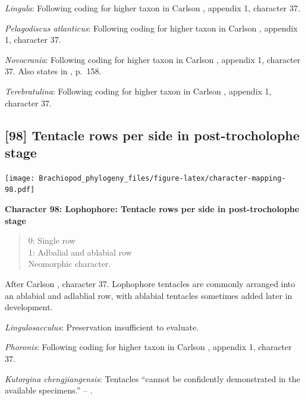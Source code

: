 \documentclass[]{book}
\theoremstyle{definition}
\theoremstyle{definition}
\theoremstyle{definition}
\theoremstyle{remark}
\begin{document}
\emph{Lingula}: Following coding for higher taxon in Carlson
\citeyearpar{Carlson1995Phylogeneticrelationships}, appendix 1,
character 37.

\emph{Pelagodiscus atlanticus}: Following coding for higher taxon in
Carlson \citeyearpar{Carlson1995Phylogeneticrelationships}, appendix 1,
character 37.

\emph{Novocrania}: Following coding for higher taxon in Carlson
\citeyearpar{Carlson1995Phylogeneticrelationships}, appendix 1,
character 37. Also states in
\citet{Williams2000BrachiopodaLinguliformea}, p.~158.

\emph{Terebratulina}: Following coding for higher taxon in Carlson
\citeyearpar{Carlson1995Phylogeneticrelationships}, appendix 1,
character 37.

\hypertarget{tentacle-rows-per-side-in-post-trocholophe-stage}{%
\subsection*{{[}98{]} Tentacle rows per side in post-trocholophe
stage}\label{tentacle-rows-per-side-in-post-trocholophe-stage}}

\texttt{[image: Brachiopod\_phylogeny\_files/figure-latex/character-mapping-98.pdf]}

\textbf{Character 98: Lophophore: Tentacle rows per side in
post-trocholophe stage}

\begin{quote}
0: Single row\\
1: Adbalial and ablabial row\\
Neomorphic character.
\end{quote}

After Carlson \citeyearpar{Carlson1995Phylogeneticrelationships},
character 37. Lophophore tentacles are commonly arranged into an
ablabial and adlablial row, with ablabial tentacles sometimes added
later in development.

\emph{Lingulosacculus}: Preservation insufficient to evaluate.

\emph{Phoronis}: Following coding for higher taxon in Carlson
\citeyearpar{Carlson1995Phylogeneticrelationships}, appendix 1,
character 37.

\emph{Kutorgina chengjiangensis}: Tentacles ``cannot be confidently
demonstrated in the available specimens.'' --
\citet{Zhang2007Rhynchonelliformeanbrachiopods}.
\end{document}
